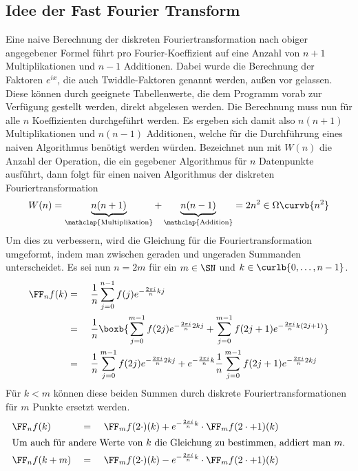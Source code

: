 	\subsection{Idee der Fast Fourier Transform} %
	\label{sub:idee_der_fast_fourier_transform}
	
		Eine naive Berechnung der diskreten Fouriertransformation nach obiger angegebener Formel führt pro Fourier-Koeffizient auf eine Anzahl von $n+1$ Multiplikationen und $n-1$ Additionen.
		Dabei wurde die Berechnung der Faktoren $e^{ix}$, die auch Twiddle-Faktoren genannt werden, außen vor gelassen.
		Diese können durch geeignete Tabellenwerte, die dem Programm vorab zur Verfügung gestellt werden, direkt abgelesen werden.
		Die Berechnung muss nun für alle $n$ Koeffizienten durchgeführt werden.
		Es ergeben sich damit also $n(n+1)$ Multiplikationen und $n(n-1)$ Additionen, welche für die Durchführung eines naiven Algorithmus benötigt werden würden.
		Bezeichnet nun mit $W(n)$ die Anzahl der Operation, die ein gegebener Algorithmus für $n$ Datenpunkte ausführt, dann folgt für einen naiven Algorithmus der diskreten Fouriertransformation
		\[ W(n) = \underbrace{n(n+1)}_{\mathclap{\mathrm{Multiplikation}}} + \underbrace{n(n-1)}_{\mathclap{\mathrm{Addition}}} = 2n^2 \in \Omega\curvb{n^2} \]
		Um dies zu verbessern, wird die Gleichung für die Fouriertransformation umgeformt, indem man zwischen geraden und ungeraden Summanden unterscheidet.
		Es sei nun $n=2m$ für ein $m\in\SN$ und $k\in\curlb{0,\ldots,n-1}$.
		\begin{alignat*}{3}
			\FF_n f(k) &=&& \ \frac{1}{n} \sum_{j=0}^{n-1} f(j)e^{-\frac{2\pi i}{n}kj} \\
			&=&& \ \frac{1}{n} \boxb{ \sum_{j=0}^{m-1} f(2j)e^{-\frac{2\pi i}{n}2kj} + \sum_{j=0}^{m-1} f(2j+1)e^{-\frac{2\pi i}{n}k(2j+1)} } \\
			&=&& \ \frac{1}{n} \sum_{j=0}^{m-1} f(2j)e^{-\frac{2\pi i}{n}2kj} + e^{-\frac{2\pi i}{n}k} \frac{1}{n} \sum_{j=0}^{m-1} f(2j+1)e^{-\frac{2\pi i}{n}2kj}
		\end{alignat*}
		Für $k<m$ können diese beiden Summen durch diskrete Fouriertransformationen für $m$ Punkte ersetzt werden.
		\begin{alignat*}{3}
			&\FF_n f(k) &&=&& \ \FF_m f(2\cdot)(k) + e^{-\frac{2\pi i}{n}k} \cdot\FF_m f(2\cdot+1)(k) \\
			\intertext{Um auch für andere Werte von $k$ die Gleichung zu bestimmen, addiert man $m$.}
			&\FF_n f(k+m) &&=&& \ \FF_m f(2\cdot)(k) - e^{-\frac{2\pi i}{n}k} \cdot\FF_m f(2\cdot+1)(k)
		\end{alignat*}
